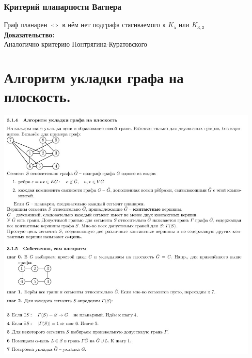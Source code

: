 \documentclass[12pt]{article}
\begin{document}
\subsubsection{Критерий планарности Вагнера}
		Граф планарен $\Leftrightarrow$ в нём нет подграфа стягиваемого к $K_5$ или $K_{3,3}$\\
		\textbf{Доказательство:}\\
			Аналогично критерию Понтрягина-Куратовского\\
		\qedsymbol

\section{Алгоритм укладки графа на плоскость.}
		\includegraphics[width=600pt]{6}\\\\\\\\\\\\\\\\\\\\
\end{document}
